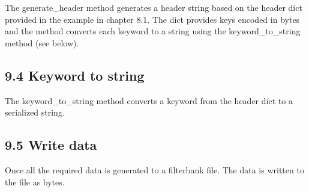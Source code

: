 \documentclass[]{article}
\begin{document}
The generate\_header method generates a header string based on the
header dict provided in the example in chapter 8.1. The dict provides
keys encoded in bytes and the method converts each keyword to a string
using the keyword\_to\_string method (see below).

\subsection{9.4 Keyword to string}\label{keyword-to-string}

The keyword\_to\_string method converts a keyword from the header dict
to a serialized string.

\subsection{9.5 Write data}\label{write-data}

Once all the required data is generated to a filterbank file. The data
is written to the file as bytes.
\end{document}
